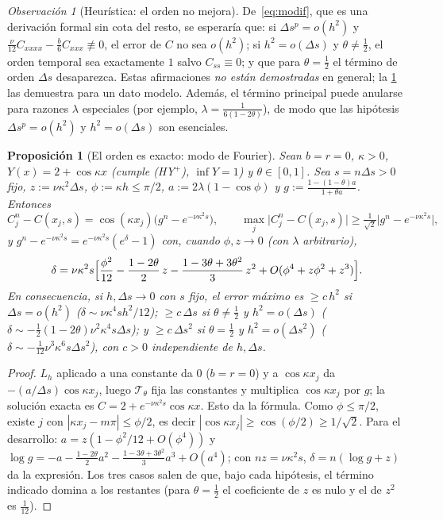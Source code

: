 \documentclass[11pt,letterpaper]{article}
\theoremstyle{plain}
\newtheorem{proposicion}[theorem]{Proposición}
\theoremstyle{definition}
\theoremstyle{remark}
\newtheorem{observacion}[theorem]{Observación}
\numberwithin{equation}{section}
\newcommand{\Top}{\mathcal{T}}
\begin{document}
	\begin{observacion}[Heurística: el orden no mejora]\label{obs:orden}
		De~\eqref{eq:modif}, que es una derivación formal sin cota del resto, se esperaría que: si \(\Delta s^p=o(h^2)\) y \(\frac\nu{12}C_{xxxx}-\frac b6C_{xxx}\not\equiv0\), el error de \(C\) no sea \(o(h^2)\); si \(h^2=o(\Delta s)\) y \(\theta\ne\frac12\), el orden temporal sea exactamente \(1\) salvo \(C_{ss}\equiv0\); y que para \(\theta=\frac12\) el término de orden \(\Delta s\) desaparezca. Estas afirmaciones \emph{no están demostradas} en general; la \cref{prop:exact} las demuestra para un dato modelo. Además, el término principal puede anularse para razones \(\lambda\) especiales (por ejemplo, \(\lambda=\frac1{6(1-2\theta)}\)), de modo que las hipótesis \(\Delta s^p=o(h^2)\) y \(h^2=o(\Delta s)\) son esenciales.
	\end{observacion}
	
	\begin{proposicion}[El orden es exacto: modo de Fourier]\label{prop:exact}
		Sean \(b=r=0\), \(\kappa>0\), \(Y(x)=2+\cos\kappa x\) (cumple (HY\(^+\)), \(\inf Y=1\)) y \(\theta\in[0,1]\). Sea \(s=n\Delta s>0\) fijo, \(z:=\nu\kappa^2\Delta s\), \(\phi:=\kappa h\le\pi/2\), \(a:=2\lambda(1-\cos\phi)\) y \(g:=\frac{1-(1-\theta)a}{1+\theta a}\). Entonces
		\[
		C^n_j-C(x_j,s)=\cos(\kappa x_j)\bigl(g^n-e^{-\nu\kappa^2s}\bigr),\qquad\max_j\bigl|C^n_j-C(x_j,s)\bigr|\ge\tfrac1{\sqrt2}\bigl|g^n-e^{-\nu\kappa^2s}\bigr|,
		\]
		y \(g^n-e^{-\nu\kappa^2s}=e^{-\nu\kappa^2s}(e^\delta-1)\) con, cuando \(\phi,z\to0\) (con \(\lambda\) arbitrario),
		\[
		\delta=\nu\kappa^2s\Bigl[\frac{\phi^2}{12}-\frac{1-2\theta}2\,z-\frac{1-3\theta+3\theta^2}3\,z^2+O(\phi^4+z\phi^2+z^3)\Bigr].
		\]
		En consecuencia, si \(h,\Delta s\to0\) con \(s\) fijo, el error máximo es \(\ge c\,h^2\) si \(\Delta s=o(h^2)\) (\(\delta\sim\nu\kappa^4sh^2/12\)); \(\ge c\,\Delta s\) si \(\theta\ne\frac12\) y \(h^2=o(\Delta s)\) (\(\delta\sim-\frac12(1-2\theta)\nu^2\kappa^4s\Delta s\)); y \(\ge c\,\Delta s^2\) si \(\theta=\frac12\) y \(h^2=o(\Delta s^2)\) (\(\delta\sim-\frac1{12}\nu^3\kappa^6s\Delta s^2\)), con \(c>0\) independiente de \(h,\Delta s\).
	\end{proposicion}
	
	\begin{proof}
		\(L_h\) aplicado a una constante da \(0\) (\(b=r=0\)) y a \(\cos\kappa x_j\) da \(-(a/\Delta s)\cos\kappa x_j\), luego \(\Top_\theta\) fija las constantes y multiplica \(\cos\kappa x_j\) por \(g\); la solución exacta es \(C=2+e^{-\nu\kappa^2s}\cos\kappa x\). Esto da la fórmula. Como \(\phi\le\pi/2\), existe \(j\) con \(|\kappa x_j-m\pi|\le\phi/2\), es decir \(|\cos\kappa x_j|\ge\cos(\phi/2)\ge1/\sqrt2\). Para el desarrollo: \(a=z(1-\phi^2/12+O(\phi^4))\) y \(\log g=-a-\frac{1-2\theta}2a^2-\frac{1-3\theta+3\theta^2}3a^3+O(a^4)\); con \(nz=\nu\kappa^2s\), \(\delta=n(\log g+z)\) da la expresión. Los tres casos salen de que, bajo cada hipótesis, el término indicado domina a los restantes (para \(\theta=\frac12\) el coeficiente de \(z\) es nulo y el de \(z^2\) es \(\frac1{12}\)).
	\end{proof}
	
\end{document}
